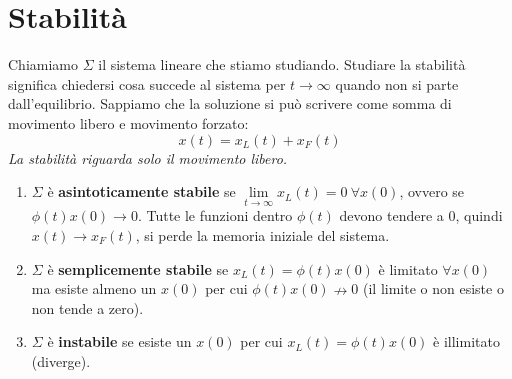 \documentclass[10pt,a4paper]{book}
\begin{document}
\chapter{Stabilità}

Chiamiamo $\Sigma $ il sistema lineare che stiamo studiando. Studiare la stabilità significa chiedersi cosa succede al sistema per $t\rightarrow \infty $ quando non si parte dall'equilibrio. Sappiamo che la soluzione si può scrivere come somma di movimento libero e movimento forzato:
\begin{equation*}
x\left( t\right) =x_L\left( t\right) +x_F\left( t\right)
\end{equation*}
\textit{La stabilità riguarda solo il movimento libero.}
\begin{enumerate}
\item $\Sigma $ è \textbf{asintoticamente stabile} se $\lim\limits _{t\rightarrow \infty } x_L\left( t\right) =0\ \forall x\left( 0\right)$, ovvero se $\phi \left( t\right) x\left( 0\right)\rightarrow 0$. Tutte le funzioni dentro $\phi \left( t\right)$ devono tendere a $0$, quindi $x\left( t\right)\rightarrow x_F\left( t\right)$, si perde la memoria iniziale del sistema.
\item $\Sigma $ è \textbf{semplicemente stabile} se $x_L\left( t\right) =\phi \left( t\right) x\left( 0\right)$ è limitato $\forall x\left( 0\right)$ ma esiste almeno un $x\left( 0\right)$ per cui $\phi \left( t\right) x\left( 0\right) \nrightarrow 0$ (il limite o non esiste o non tende a zero).
\item $\Sigma $ è \textbf{instabile} se esiste un $x\left( 0\right)$ per cui $x_L\left( t\right) =\phi \left( t\right) x\left( 0\right)$ è illimitato (diverge).
\end{enumerate}
\end{document}
